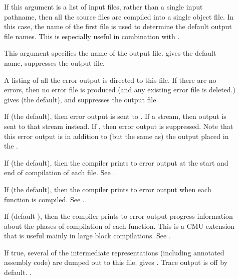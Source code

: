 \begin{description}

\item[] If this argument is a list of input
files, rather than a single input pathname, then all the source files
are compiled into a single object file.  In this case, the name of
the first file is used to determine the default output file names.
This is especially useful in combination with .

\item[] This argument specifies the name of the
output file.  \true{} gives the default name, \false{} suppresses the
output file.

\item[] A listing of all the error output is directed
to this file.  If there are no errors, then no error file is produced
(and any existing error file is deleted.)  \true{} gives
 (the default), and \false{} suppresses
the output file.

\item[]
If \true{} (the default), then error output is sent to .  If
a stream, then output is sent to that stream instead.  If \false, then error
output is suppressed.  Note that this error output is in addition to (but the
same as) the output placed in the .

\item[] If \true{} (the default), then the compiler
prints to error output at the start and end of compilation of each
file.  See .

\item[]
If \true{} (the default), then the compiler prints to error output
when each function is compiled.  See .

\item[] If \true{} (default \false{}), then the
compiler prints to error output progress information about the phases
of compilation of each function.  This is a CMU extension that is
useful mainly in large block compilations.  See .

\item[] If true, several of the intermediate
representations (including annotated assembly code) are dumped out to
this file.  \true{} gives .  Trace
output is off by default.  .


\end{description}
